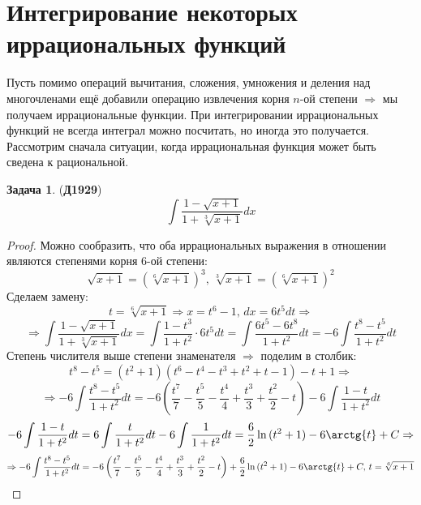 \documentclass[12pt]{article}
\theoremstyle{definition}
\newtheorem{problem}{Задача}
\DeclareMathOperator{\dint}{\displaystyle\int}
\begin{document}
\newpage
\section*{Интегрирование некоторых иррациональных функций}
Пусть помимо операций вычитания, сложения,  умножения и деления над многочленами ещё добавили операцию извлечения корня $n$-ой степени $\Rightarrow$ мы получаем иррациональные функции. При интегрировании иррациональных функций не всегда интеграл можно посчитать, но иногда это получается. Рассмотрим сначала ситуации, когда иррациональная функция может быть сведена к рациональной.

\begin{problem}(\textbf{Д1929})
	$$
		\dint \dfrac{1 - \sqrt{x + 1}}{1 + \sqrt[3]{x + 1}}dx
	$$
\end{problem}
\begin{proof}
	Можно сообразить, что оба иррациональных выражения в отношении являются степенями корня $6$-ой степени: 
	$$
		\sqrt{x+1} = (\sqrt[6]{x + 1})^3, \, \sqrt[3]{x + 1} = (\sqrt[6]{x + 1})^2
	$$
	Сделаем замену:
	$$
		t = \sqrt[6]{x+1} \Rightarrow x = t^6 - 1, \, dx = 6t^5dt \Rightarrow
	$$
	$$
		\Rightarrow \dint \dfrac{1 - \sqrt{x + 1}}{1 + \sqrt[3]{x + 1}}dx = \dint \dfrac{1 - t^3}{1 + t^2}{\cdot}6t^5 dt = \dint \dfrac{6t^5 - 6t^8}{1 + t^2}dt = -6 \dint\dfrac{t^8 - t^5}{1 + t^2}dt
	$$
	Степень числителя выше степени знаменателя $\Rightarrow$ поделим в столбик:
	$$
		t^8 - t^5 = (t^2 + 1)(t^6 - t^4 -t^3 + t^2 + t -1) - t + 1 \Rightarrow
	$$
	$$
		\Rightarrow -6 \dint\dfrac{t^8 - t^5}{1 + t^2}dt = -6\left(\dfrac{t^7}{7} - \dfrac{t^5}{5} - \dfrac{t^4}{4} + \dfrac{t^3}{3} + \dfrac{t^2}{2} - t\right) -6\dint\dfrac{1 -t}{1 + t^2}dt
	$$
	$$
		-6\dint\dfrac{1 -t}{1 + t^2}dt = 6\dint\dfrac{t}{1 +t^2}dt - 6\dint\dfrac{1}{1+t^2}dt =  \dfrac{6}{2}\ln{(t^2 + 1)} - 6\arctg{t} + C \Rightarrow 
	$$
	$$
		\Rightarrow -6 \dint\dfrac{t^8 - t^5}{1 + t^2}dt = -6\left(\dfrac{t^7}{7} - \dfrac{t^5}{5} - \dfrac{t^4}{4} + \dfrac{t^3}{3} + \dfrac{t^2}{2} - t\right) + \dfrac{6}{2}\ln{(t^2 + 1)} - 6\arctg{t} + C, \, t = \sqrt[6]{x + 1}
	$$
\end{proof}
\end{document}
